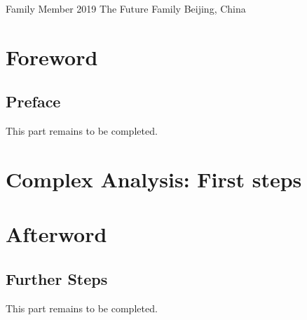 \documentclass[11pt]{notebook}
\begin{document}
        {Family Member}
        {2019}
        {The Future Family}
        {Beijing, China}

\part*{Foreword}

\chapter*{Preface}

This part remains to be completed.


\cleardoublepage
{}

\part{Complex Analysis: First steps}



\part*{Afterword}

\chapter{Further Steps}

This part remains to be completed.



\cleardoublepage
{}
\renewcommand{\bibname}{Literature}



\cleardoublepage
{}
\printindex
\end{document}
